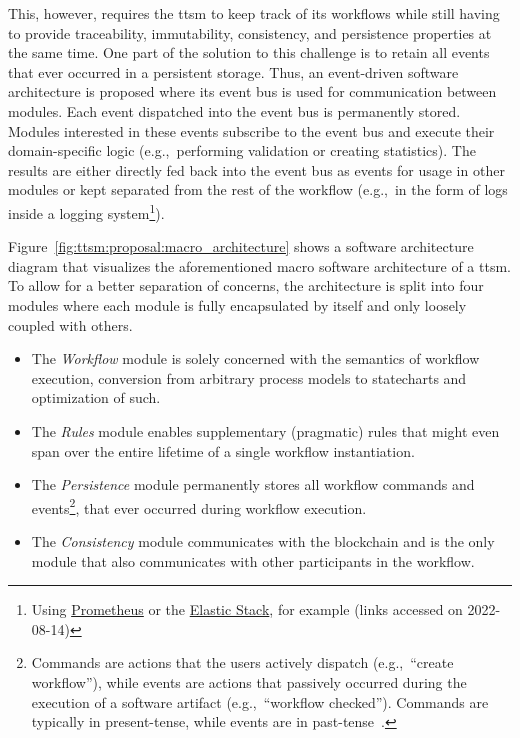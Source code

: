 This, however, requires the \gls{ttsm} to keep track of its workflows while still having to provide traceability, immutability, consistency, and persistence properties at the same time. One part of the solution to this challenge is to retain all events that ever occurred in a persistent storage. Thus, an event-driven software architecture is proposed where its event bus is used for communication between modules. Each event dispatched into the event bus is permanently stored. Modules interested in these events subscribe to the event bus and execute their domain-specific logic (e.g.,\ performing validation or creating statistics). The results are either directly fed back into the event bus as events for usage in other modules or kept separated from the rest of the workflow (e.g.,\ in the form of logs inside a logging system\footnote{Using \href{https://prometheus.io/}{Prometheus} or the \href{https://elastic.co/}{Elastic Stack}, for example (links accessed on 2022-08-14)}).

Figure~\ref{fig:ttsm:proposal:macro_architecture} shows a software architecture diagram that visualizes the aforementioned macro software architecture of a \gls{ttsm}. To allow for a better separation of concerns, the architecture is split into four modules where each module is fully encapsulated by itself and only loosely coupled with others.

\begin{itemize}
    \item The \textcolor{workflow_layer}{\textit{Workflow}} module is solely concerned with the semantics of workflow execution, conversion from arbitrary process models to statecharts and optimization of such.
    \item The \textcolor{rules_layer}{\textit{Rules}} module enables supplementary (pragmatic) rules that might even span over the entire lifetime of a single workflow instantiation.
    \item The \textcolor{persistence_layer}{\textit{Persistence}} module permanently stores all workflow commands and events\footnote{Commands are actions that the users actively dispatch (e.g.,\ ``create workflow''), while events are actions that passively occurred during the execution of a software artifact (e.g.,\ ``workflow checked''). Commands are typically in present-tense, while events are in past-tense~\cite{whats_in_an_event_name}.}, that ever occurred during workflow execution.
    \item The \textcolor{consistency_layer}{\textit{Consistency}} module communicates with the blockchain and is the only module that also communicates with other participants in the workflow.
\end{itemize}

